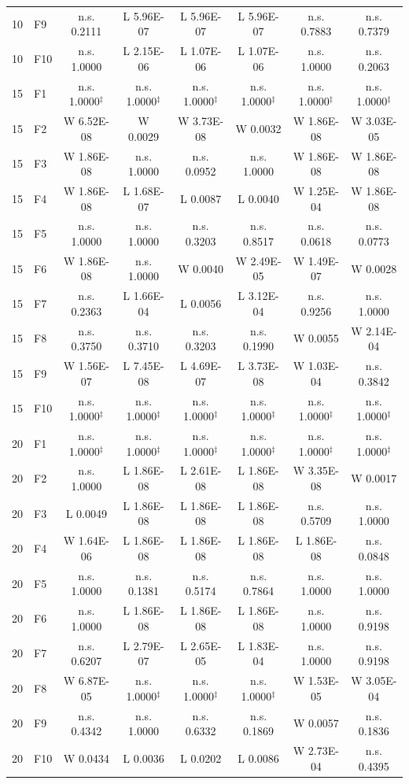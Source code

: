 \documentclass[10pt,a4paper]{article}
\begin{document}
\begin{table}[p]
\begin{tabular}{clcccccc}
10 & F9 & n.s. 0.2111 & L 5.96E-07 & L 5.96E-07 & L 5.96E-07 & n.s. 0.7883 & n.s. 0.7379 \\
10 & F10 & n.s. 1.0000 & L 2.15E-06 & L 1.07E-06 & L 1.07E-06 & n.s. 1.0000 & n.s. 0.2063 \\
\midrule
15 & F1 & n.s. 1.0000$^{\ddagger}$ & n.s. 1.0000$^{\ddagger}$ & n.s. 1.0000$^{\ddagger}$ & n.s. 1.0000$^{\ddagger}$ & n.s. 1.0000$^{\ddagger}$ & n.s. 1.0000$^{\ddagger}$ \\
15 & F2 & W 6.52E-08 & W 0.0029 & W 3.73E-08 & W 0.0032 & W 1.86E-08 & W 3.03E-05 \\
15 & F3 & W 1.86E-08 & n.s. 1.0000 & n.s. 0.0952 & n.s. 1.0000 & W 1.86E-08 & W 1.86E-08 \\
15 & F4 & W 1.86E-08 & L 1.68E-07 & L 0.0087 & L 0.0040 & W 1.25E-04 & W 1.86E-08 \\
15 & F5 & n.s. 1.0000 & n.s. 1.0000 & n.s. 0.3203 & n.s. 0.8517 & n.s. 0.0618 & n.s. 0.0773 \\
15 & F6 & W 1.86E-08 & n.s. 1.0000 & W 0.0040 & W 2.49E-05 & W 1.49E-07 & W 0.0028 \\
15 & F7 & n.s. 0.2363 & L 1.66E-04 & L 0.0056 & L 3.12E-04 & n.s. 0.9256 & n.s. 1.0000 \\
15 & F8 & n.s. 0.3750 & n.s. 0.3710 & n.s. 0.3203 & n.s. 0.1990 & W 0.0055 & W 2.14E-04 \\
15 & F9 & W 1.56E-07 & L 7.45E-08 & L 4.69E-07 & L 3.73E-08 & W 1.03E-04 & n.s. 0.3842 \\
15 & F10 & n.s. 1.0000$^{\ddagger}$ & n.s. 1.0000$^{\ddagger}$ & n.s. 1.0000$^{\ddagger}$ & n.s. 1.0000$^{\ddagger}$ & n.s. 1.0000$^{\ddagger}$ & n.s. 1.0000$^{\ddagger}$ \\
\midrule
20 & F1 & n.s. 1.0000$^{\ddagger}$ & n.s. 1.0000$^{\ddagger}$ & n.s. 1.0000$^{\ddagger}$ & n.s. 1.0000$^{\ddagger}$ & n.s. 1.0000$^{\ddagger}$ & n.s. 1.0000$^{\ddagger}$ \\
20 & F2 & n.s. 1.0000 & L 1.86E-08 & L 2.61E-08 & L 1.86E-08 & W 3.35E-08 & W 0.0017 \\
20 & F3 & L 0.0049 & L 1.86E-08 & L 1.86E-08 & L 1.86E-08 & n.s. 0.5709 & n.s. 1.0000 \\
20 & F4 & W 1.64E-06 & L 1.86E-08 & L 1.86E-08 & L 1.86E-08 & L 1.86E-08 & n.s. 0.0848 \\
20 & F5 & n.s. 1.0000 & n.s. 0.1381 & n.s. 0.5174 & n.s. 0.7864 & n.s. 1.0000 & n.s. 1.0000 \\
20 & F6 & n.s. 1.0000 & L 1.86E-08 & L 1.86E-08 & L 1.86E-08 & n.s. 1.0000 & n.s. 0.9198 \\
20 & F7 & n.s. 0.6207 & L 2.79E-07 & L 2.65E-05 & L 1.83E-04 & n.s. 1.0000 & n.s. 0.9198 \\
20 & F8 & W 6.87E-05 & n.s. 1.0000$^{\ddagger}$ & n.s. 1.0000$^{\ddagger}$ & n.s. 1.0000$^{\ddagger}$ & W 1.53E-05 & W 3.05E-04 \\
20 & F9 & n.s. 0.4342 & n.s. 1.0000 & n.s. 0.6332 & n.s. 0.1869 & W 0.0057 & n.s. 0.1836 \\
20 & F10 & W 0.0434 & L 0.0036 & L 0.0202 & L 0.0086 & W 2.73E-04 & n.s. 0.4395 \\
\bottomrule
\end{tabular}
\end{table}
\end{document}
